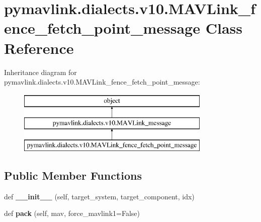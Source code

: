 \hypertarget{classpymavlink_1_1dialects_1_1v10_1_1MAVLink__fence__fetch__point__message}{}\section{pymavlink.\+dialects.\+v10.\+M\+A\+V\+Link\+\_\+fence\+\_\+fetch\+\_\+point\+\_\+message Class Reference}
\label{classpymavlink_1_1dialects_1_1v10_1_1MAVLink__fence__fetch__point__message}
Inheritance diagram for pymavlink.\+dialects.\+v10.\+M\+A\+V\+Link\+\_\+fence\+\_\+fetch\+\_\+point\+\_\+message\+:\begin{figure}[H]
\begin{center}
\leavevmode
\includegraphics[height=3.000000cm]{classpymavlink_1_1dialects_1_1v10_1_1MAVLink__fence__fetch__point__message}
\end{center}
\end{figure}
\subsection*{Public Member Functions}
\begin{DoxyCompactItemize}
\item 
\mbox{\label{classpymavlink_1_1dialects_1_1v10_1_1MAVLink__fence__fetch__point__message_ae5e086e81653a624c7fb99a6adcfb81c}} 
def {\bfseries \+\_\+\+\_\+init\+\_\+\+\_\+} (self, target\+\_\+system, target\+\_\+component, idx)
\item 
\mbox{\label{classpymavlink_1_1dialects_1_1v10_1_1MAVLink__fence__fetch__point__message_a62b4e0cb110b96c317b233f98c371c31}} 
def {\bfseries pack} (self, mav, force\+\_\+mavlink1=False)
\end{DoxyCompactItemize}
